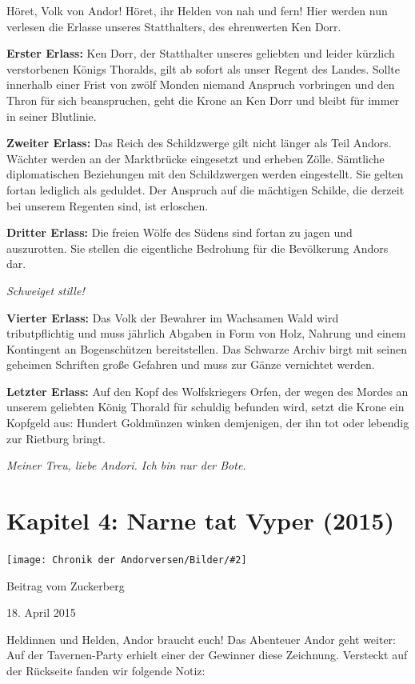 \documentclass[10pt, a4paper, oneside]{book}
\newcommand{\fillbreak}{\vspace*{\fill}\columnbreak}
\newcommand{\storytext}[1]{%
    \section{#1}%
    \label{Storytext: #1}%
}
\newcommand{\bildmitts}[2][height=0.32\textwidth,width=0.48\textwidth,keepaspectratio]{%
    \begin{center}
        \texttt{[image: Chronik der Andorversen/Bilder/\#2]}
    \end{center}
}
\begin{document}
\begin{multicols}{2}
Höret, Volk von Andor! Höret, ihr Helden von nah und fern! Hier werden nun verlesen die Erlasse unseres Statthalters, des ehrenwerten Ken Dorr.

\textbf{Erster Erlass:} Ken Dorr, der Statthalter unseres geliebten und leider kürzlich verstorbenen Königs Thoralds, gilt ab sofort als unser Regent des Landes. Sollte innerhalb einer Frist von zwölf Monden niemand Anspruch vorbringen und den Thron für sich beanspruchen, geht die Krone an Ken Dorr und bleibt für immer in seiner Blutlinie.

\textbf{Zweiter Erlass:} Das Reich des Schildzwerge gilt nicht länger als Teil Andors. Wächter werden an der Marktbrücke eingesetzt und erheben Zölle. Sämtliche diplomatischen Beziehungen mit den Schildzwergen werden eingestellt. Sie gelten fortan lediglich als geduldet. Der Anspruch auf die mächtigen Schilde, die derzeit bei unserem Regenten sind, ist erloschen.

\textbf{Dritter Erlass:} Die freien Wölfe des Südens sind fortan zu jagen und auszurotten. Sie stellen die eigentliche Bedrohung für die Bevölkerung Andors dar.

\textit{Schweiget stille!}

\textbf{Vierter Erlass:} Das Volk der Bewahrer im Wachsamen Wald wird tributpflichtig und muss jährlich Abgaben in Form von Holz, Nahrung und einem Kontingent an Bogenschützen bereitstellen. Das Schwarze Archiv birgt mit seinen geheimen Schriften große Gefahren und muss zur Gänze vernichtet werden.

\textbf{Letzter Erlass:} Auf den Kopf des Wolfskriegers Orfen, der wegen des Mordes an unserem geliebten König Thorald für schuldig befunden wird, setzt die Krone ein Kopfgeld aus: Hundert Goldmünzen winken demjenigen, der ihn tot oder lebendig zur Rietburg bringt.

\textit{Meiner Treu, liebe Andori. Ich bin nur der Bote.}




\fillbreak
\storytext{Kapitel 4: Narne tat Vyper (2015)}

\bildmitts{AA2015 Narne tat Vyper 1.jpeg}

\begin{center}
    Beitrag vom Zuckerberg

    18. April 2015
\end{center}

Heldinnen und Helden, Andor braucht euch! Das Abenteuer Andor geht weiter: Auf der Tavernen-Party erhielt einer der Gewinner diese Zeichnung. Versteckt auf der Rückseite fanden wir folgende Notiz: 


\end{multicols}
\end{document}
